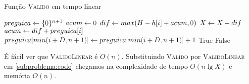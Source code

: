 \begin{algorithm}[H]
\caption{Função \textsc{Valido} em tempo linear}
\label{subproblema:code_linear}
\begin{algorithmic}[1]
    \State $preguica \leftarrow \{0\}^{n + 1}$
    \State $acum \leftarrow 0$
        \State $dif \leftarrow max(H - h[i] + acum, 0)$
        \State $X \leftarrow X - dif$
        \State $acum \leftarrow dif + preguica[i]$
        \State $preguica[min(i + D, n + 1)] \leftarrow preguica[min(i + D, n + 1)] + 1$
    \EndFor
        \State \Return True
    \Else
        \State \Return False
    \EndIf
\EndFunction
\end{algorithmic}
\end{algorithm}

É fácil ver que \textsc{ValidoLinear} é $O(n)$. Substituindo \textsc{Valido} por \textsc{ValidoLinear} em \ref{subproblema:code} chegamos na complexidade de tempo $O(n \lg X)$ e memória $O(n)$.
